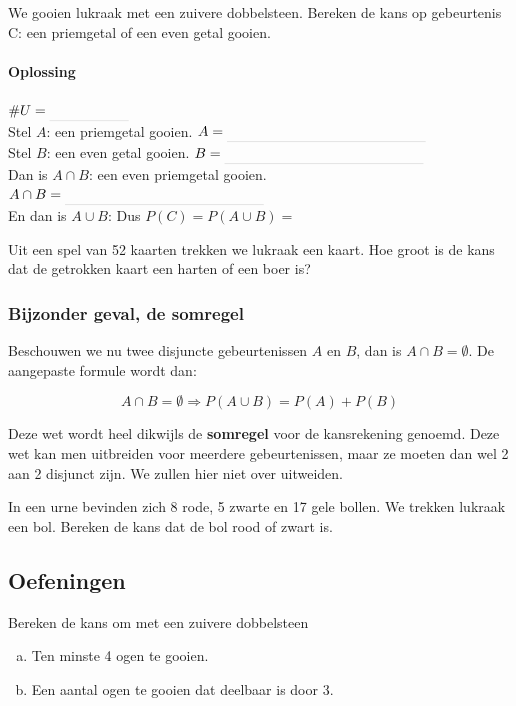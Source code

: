 \documentclass[12pt,twoside]{article}
\begin{document}
\begin{oefening}
We gooien lukraak met een zuivere dobbelsteen. Bereken de kans op gebeurtenis C:
een priemgetal of een even getal gooien.
\paragraph*{Oplossing} $\#U=\arule{2cm}$\\
Stel $A$: een priemgetal gooien. $A=\arule{5cm}$\\
Stel $B$: een even getal gooien. $B=\arule{5cm}$\\
Dan is $A\cap B$: een even priemgetal gooien. $A\cap B=\arule{5cm}$\\
En dan is $A\cup B$: \arulefill
Dus $P(C)=P(A\cup B)=$
\end{oefening}

\begin{oefening}
Uit een spel van 52 kaarten trekken we lukraak een kaart. Hoe groot is de kans dat de
getrokken kaart een harten of een boer is?
\end{oefening}

\subsubsection{Bijzonder geval, de somregel}
Beschouwen we nu twee disjuncte gebeurtenissen $A$ en $B$, dan is $A \cap B = \emptyset$.
De aangepaste formule wordt dan:\\
\begin{mdframed}
$$A \cap B = \emptyset \Rightarrow P(A\cup B)=P(A)+P(B)$$
\end{mdframed}
Deze wet wordt heel dikwijls de {\bf somregel} voor de kansrekening genoemd. Deze wet
kan men uitbreiden voor meerdere gebeurtenissen, maar ze moeten dan wel 2 aan 2
disjunct zijn. We zullen hier niet over uitweiden.

\begin{oefening}
In een urne bevinden zich 8 rode, 5 zwarte en 17 gele bollen. We trekken lukraak een
bol. Bereken de kans dat de bol rood of zwart is.
\end{oefening}

\subsection{Oefeningen}

\begin{oefening}
Bereken de kans om met een zuivere dobbelsteen
\begin{enumerate}[(a)]
  \item Ten minste 4 ogen te gooien.
  \item Een aantal ogen te gooien dat deelbaar is door 3.
\end{enumerate}
\end{oefening}
\end{document}
